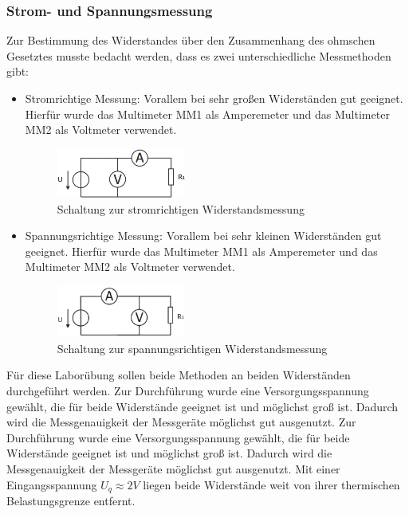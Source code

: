 \documentclass[a4paper]{article}
\begin{document}
\subsubsection*{Strom- und Spannungsmessung}
Zur Bestimmung des Widerstandes über den Zusammenhang des ohmschen Gesetztes musste
bedacht werden, dass es zwei unterschiedliche Messmethoden gibt:
\begin{itemize}
    \item Stromrichtige Messung:
        Vorallem bei sehr großen Widerständen gut geeignet. Hierfür wurde das
        Multimeter MM1 als Amperemeter und das Multimeter MM2 als Voltmeter verwendet.
        \begin{figure}[h]
            \centering
            \includegraphics[width=0.4\textwidth]{schematics/3a_stromrichtigeWidMessung.png}
            \caption{Schaltung zur stromrichtigen Widerstandsmessung}
            \label{fig:3a_stromrichtigeWidMessung}
        \end{figure}
    \item Spannungsrichtige Messung:
        Vorallem bei sehr kleinen Widerständen gut geeignet. Hierfür wurde das
        Multimeter MM1 als Amperemeter und das Multimeter MM2 als Voltmeter verwendet.
        \begin{figure}[h]
            \centering
            \includegraphics[width=0.4\textwidth]{schematics/3b_spannungsrichtigeWidMessung.png}
            \caption{Schaltung zur spannungsrichtigen Widerstandsmessung}
            \label{fig:3b_spgsrichtigeWidMessung}
        \end{figure}
\end{itemize}
Für diese Laborübung sollen beide Methoden an beiden Widerständen durchgeführt werden.
Zur Durchführung wurde eine Versorgungsspannung gewählt, die für beide Widerstände
geeignet ist und möglichst groß ist. Dadurch wird die Messgenauigkeit der
Messgeräte möglichst gut ausgenutzt.
Zur Durchführung wurde eine Versorgungsspannung gewählt, die für beide Widerstände
geeignet ist und möglichst groß ist. Dadurch wird die Messgenauigkeit der
Messgeräte möglichst gut ausgenutzt. Mit einer Eingangsspannung $U_{q}\approx 2V$
liegen beide Widerstände weit von ihrer thermischen Belastungsgrenze entfernt.
\end{document}

